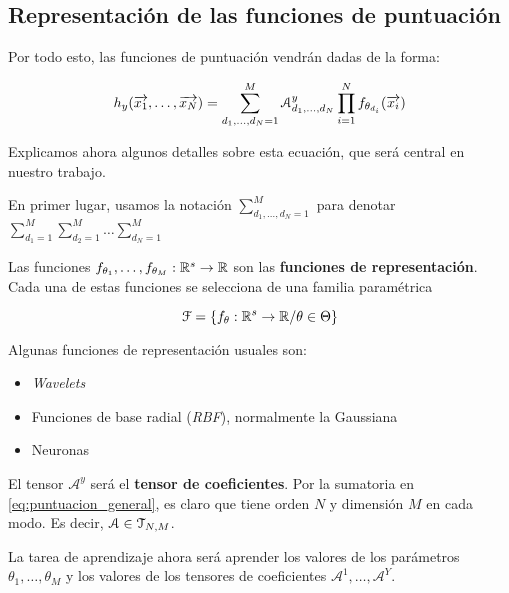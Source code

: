 \subsection{Representación de las funciones de puntuación} \label{sec:repr_funciones_puntuacion}

Por todo esto, las funciones de puntuación vendrán dadas de la forma:

\begin{equation} \label{eq:puntuacion_general}
    h_y(\overrightarrow{x_1}, \ldots, \overrightarrow{x_N}) = \sum_{d_1, \ldots, d_N = 1}^{M} \mathcal{A}^y_{d_1, \ldots, d_N} \prod_{i = 1}^N f_{\theta_{d_i}}(\overrightarrow{x_i})
\end{equation}

Explicamos ahora algunos detalles sobre esta ecuación, que será central en nuestro trabajo.

En primer lugar, usamos la notación $\sum_{d_1, \ldots, d_N = 1}^{M}$ para denotar $\sum_{d_1 = 1}^{M} \sum_{d_2 = 1}^{M} \ldots \sum_{d_N = 1}^{M}$

Las funciones $f_{\theta_1}, \ldots, f_{\theta_M}: \mathbb{R}^s \to \mathbb{R}$ son las \textbf{funciones de representación}. Cada una de estas funciones se selecciona de una familia paramétrica

$$\mathcal{F} = \{ f_{\theta}: \mathbb{R}^s \to \mathbb{R} / \theta \in \Theta \}$$

Algunas funciones de representación usuales son:

\begin{itemize}
    \item \textit{Wavelets}
    \item Funciones de base radial (\textit{RBF}), normalmente la Gaussiana
    \item Neuronas
\end{itemize}

El tensor $\mathcal{A}^y$ será el \textbf{tensor de coeficientes}. Por la sumatoria en \eqref{eq:puntuacion_general}, es claro que tiene orden $N$ y dimensión $M$ en cada modo. Es decir, $\mathcal{A} \in \mathcal{T}_{N, M}$.

La tarea de aprendizaje ahora será aprender los valores de los parámetros $\theta_1, \ldots, \theta_M$ y los valores de los tensores de coeficientes $\mathcal{A}^1, \ldots, \mathcal{A}^Y$.

